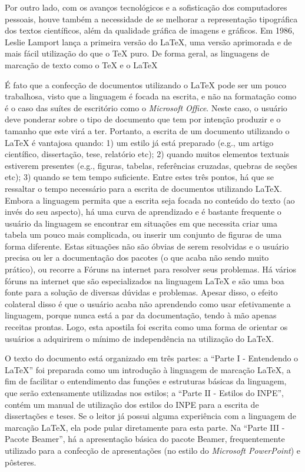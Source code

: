 Por outro lado, com os avanços tecnológicos e a sofisticação dos computadores pessoais, houve também a necessidade de se melhorar a representação tipográfica dos textos científicos, além da qualidade gráfica de imagens e gráficos. Em 1986, Leslie Lamport lança a primeira versão do \LaTeX{}, uma versão aprimorada e de mais fácil utilização do que o \TeX{} puro. De forma geral, as linguagens de marcação de texto como o \TeX{} e o \LaTeX{}

É fato que a confecção de documentos utilizando o \LaTeX{} pode ser um pouco trabalhosa, visto que a linguagem é focada na escrita, e não na formatação como é o caso das suítes de escritório como o \textit{Microsoft Office}. Neste caso, o usuário deve ponderar sobre o tipo de documento que tem por intenção produzir e o tamanho que este virá a ter. Portanto, a escrita de um documento utilizando o \LaTeX{} é vantajosa quando: 1) um estilo já está preparado (e.g., um artigo científico, dissertação, tese, relatório etc); 2) quando muitos elementos textuais estiverem presentes (e.g., figuras, tabelas, referências cruzadas, quebras de seções etc); 3) quando se tem tempo suficiente. Entre estes três pontos, há que se ressaltar o tempo necessário para a escrita de documentos utilizando \LaTeX{}. Embora a linguagem permita que a escrita seja focada no conteúdo do texto (ao invés do seu aspecto), há uma curva de aprendizado e é bastante frequente o usuário da linguagem se encontrar em situações em que necessita criar uma tabela um pouco mais complicada, ou inserir um conjunto de figuras de uma forma diferente. Estas situações não são óbvias de serem resolvidas e o usuário precisa ou ler a documentação dos pacotes (o que acaba não sendo muito prático), ou recorre a Fóruns na internet para resolver seus problemas. Há vários fóruns na internet que são especializados na linguagem \LaTeX{} e são uma boa fonte para a solução de diversas dúvidas e problemas. Apesar disso, o efeito colateral disso é que o usuário acaba não aprendendo como usar efetivamente a linguagem, porque nunca está a par da documentação, tendo à mão apenas receitas prontas. Logo, esta apostila foi escrita como uma forma de orientar os usuários a adquirirem o mínimo de independência na utilização do \LaTeX{}.


O texto do documento está organizado em três partes: a ``Parte I - Entendendo o \LaTeX{}'' foi preparada como um introdução à linguagem de marcação \LaTeX{}, a fim de facilitar o entendimento das funções e estruturas básicas da linguagem, que serão extensamente utilizadas nos estilos; a ``Parte II - Estilos do INPE'', contém um manual de utilização dos estilos do INPE para a escrita de dissertações e teses. Se o leitor já possui alguma experiência com a linguagem de marcação \LaTeX{}, ela pode pular diretamente para esta parte. Na ``Parte III - Pacote Beamer'', há a apresentação básica do pacote Beamer, frequentemente utilizado para a confecção de apresentações (no estilo do \textit{Microsoft PowerPoint}) e pôsteres.

